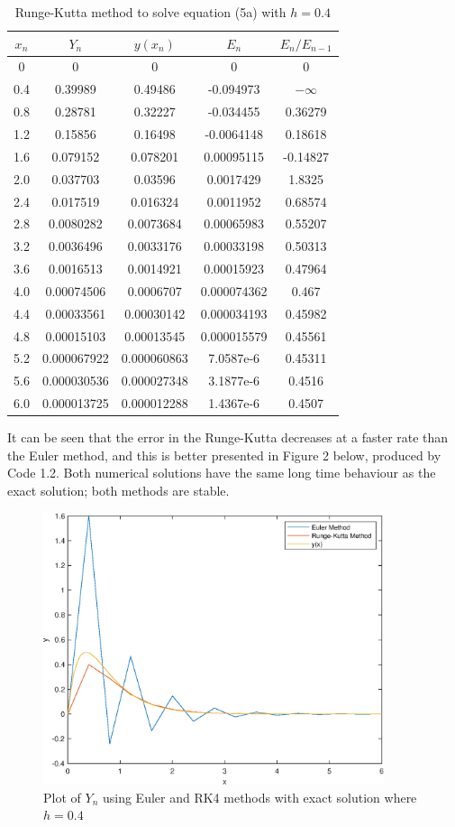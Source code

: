 \documentclass[10pt,a4paper,notitlepage]{article}
\begin{document}
\begin{table}[H]
\centering
\begin{tabular}{|c|c|c|c|c|}
\hline
$x_{n}$&$Y_{n}$&$y(x_{n})$&$E_{n}$&$E_{n}/E_{n-1}$\\ \hline
0 & 0 & 0 & 0 & 0\\ 0.4 & 0.39989 & 0.49486 & -0.094973 & $-\infty$ \\ 0.8 & 0.28781 & 0.32227 & -0.034455 & 0.36279\\ 1.2 & 0.15856 & 0.16498 & -0.0064148 & 0.18618\\ 1.6 & 0.079152 & 0.078201 & 0.00095115 & -0.14827\\ 2.0 & 0.037703 & 0.03596 & 0.0017429 & 1.8325\\ 2.4 & 0.017519 & 0.016324 & 0.0011952 & 0.68574\\ 2.8 & 0.0080282 & 0.0073684 & 0.00065983 & 0.55207\\ 3.2 & 0.0036496 & 0.0033176 & 0.00033198 & 0.50313\\ 3.6 & 0.0016513 & 0.0014921 & 0.00015923 & 0.47964\\ 4.0 & 0.00074506 & 0.0006707 & 0.000074362 & 0.467\\ 4.4 & 0.00033561 & 0.00030142 & 0.000034193 & 0.45982\\ 4.8 & 0.00015103 & 0.00013545 & 0.000015579 & 0.45561\\ 5.2 & 0.000067922 & 0.000060863 & 7.0587e-6 & 0.45311\\ 5.6 & 0.000030536 & 0.000027348 & 3.1877e-6 & 0.4516\\ 6.0 & 0.000013725 & 0.000012288 & 1.4367e-6 & 0.4507\\ \hline \end{tabular}
\caption{Runge-Kutta method to solve equation (5a) with $h=0.4$}
\end{table}
It can be seen that the error in the Runge-Kutta decreases at a faster rate than the Euler method, and this is better presented in Figure 2 below, produced by Code 1.2. Both numerical solutions have the same long time behaviour as the exact solution; both methods are stable.
\begin{figure}[H]
\begin{center}
\includegraphics[width=10cm]{Image_2_1}
\caption{Plot of $Y_{n}$ using Euler and RK4 methods with exact solution where $h=0.4$}
\end{center}
\end{figure}
\pagebreak
\end{document}
